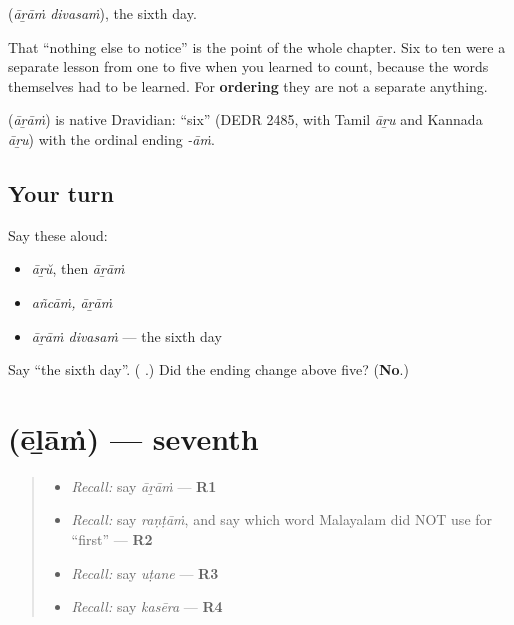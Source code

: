 \textbf{ } (\emph{āṟāṁ divasaṁ}), the sixth day.

That \textquotedblleft{}nothing else to notice\textquotedblright{} is the point of the whole chapter. Six to ten were a separate lesson from one to five when you learned to count, because the words themselves had to be learned. For \textbf{ordering} they are not a separate anything.

\begin{cousinweb}
\textbf{} (\emph{āṟāṁ}) is native Dravidian: \textquotedblleft{}six\textquotedblright{} (DEDR 2485, with Tamil \emph{āṟu} and Kannada \emph{āṟu}) with the ordinal ending \emph{-āṁ}.
\end{cousinweb}

\subsection*{Your turn}
Say these aloud:

\begin{itemize}
\raggedright
  \item \emph{āṟŭ}, then \emph{āṟāṁ}
  \item \emph{añcāṁ, āṟāṁ}
  \item \emph{āṟāṁ divasaṁ} — the sixth day
\end{itemize}

\begin{tcolorbox}[breakable,colback=teal!4,colframe=teal!35!black,title={Before you move on}]
Say \textquotedblleft{}the sixth day\textquotedblright{}. (\textbf{ }.) Did the ending change above five? (\textbf{No}.)
\end{tcolorbox}
\section[ēḻāṁ]{ (ēḻāṁ) — seventh}

\label{lesson:ML-C68-seventh}



\begin{quote}
\begin{itemize}
\raggedright
  \item \emph{Recall:} say \emph{āṟāṁ} — \textbf{R1}
  \item \emph{Recall:} say \emph{raṇṭāṁ}, and say which word Malayalam did NOT use for \textquotedblleft{}first\textquotedblright{} — \textbf{R2}
  \item \emph{Recall:} say \emph{uṭane} — \textbf{R3}
  \item \emph{Recall:} say \emph{kasēra} — \textbf{R4}
\end{itemize}
\end{quote}

